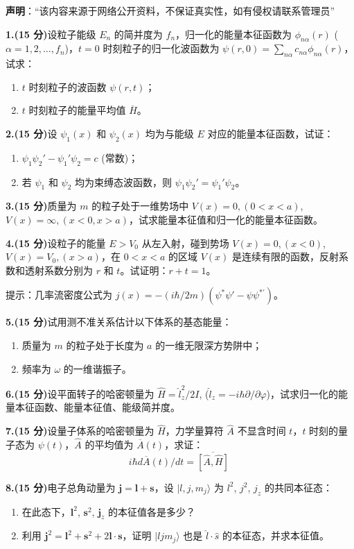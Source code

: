 
\textbf{声明}：“该内容来源于网络公开资料，不保证真实性，如有侵权请联系管理员”

\textbf{1.(15 分)}设粒子能级 $E_n$ 的简并度为 $f_n$，归一化的能量本征函数为 $\phi_{n\alpha}(r)$ ($\alpha = 1,2,\dots,f_n$)，$t = 0$ 时刻粒子的归一化波函数为 $\psi(r,0) = \sum_{n\alpha} c_{n\alpha} \phi_{n\alpha}(r)$，试求：

\begin{enumerate}
    \item $t$ 时刻粒子的波函数 $\psi(r,t)$；
    \item $t$ 时刻粒子的能量平均值 $ \overline{H} $。
\end{enumerate}

\textbf{2.(15 分)}设 $\psi_1(x)$ 和 $\psi_2(x)$ 均为与能级 $E$ 对应的能量本征函数，试证：
\begin{enumerate}
    \item $\psi_1 \psi_2' - \psi_1' \psi_2 = c$ (常数)；
    \item 若 $\psi_1$ 和 $\psi_2$ 均为束缚态波函数，则 $\psi_1 \psi_2' = \psi_1' \psi_2$。
\end{enumerate}

\textbf{3.(15 分)}质量为 $m$ 的粒子处于一维势场中 $V(x) = 0, (0 < x < a)$, $V(x) = \infty, (x < 0, x > a)$，试求能量本征值和归一化的能量本征函数。

\textbf{4.(15 分)}设粒子的能量 $E > V_0$ 从左入射，碰到势场 $V(x) = 0, (x < 0)$, $V(x) = V_0, (x > a)$，在 $0 < x < a$ 的区域 $V(x)$ 是连续有限的函数，反射系数和透射系数分别为 $r$ 和 $t$。试证明：$r + t = 1$。

提示：几率流密度公式为 $j(x) = -(i\hbar/2m)(\psi^*\psi'  - \psi\psi^{*'})$。

\textbf{5.(15 分)}试用测不准关系估计以下体系的基态能量：
\begin{enumerate}
    \item 质量为 $m$ 的粒子处于长度为 $a$ 的一维无限深方势阱中；
    \item 频率为 $\omega$ 的一维谐振子。
\end{enumerate}

\textbf{6.(15 分)}设平面转子的哈密顿量为 $\hat{H} = \hat{l}_z^2/2I$, ($\hat{l}_z = -i\hbar \partial/ \partial \varphi$)，试求归一化的能量本征函数、能量本征值、能级简并度。

\textbf{7.(15 分)}设量子体系的哈密顿量为 $\hat{H}$，力学量算符 $\hat{A}$ 不显含时间 $t$，$t$ 时刻的量子态为 $\psi(t)$，$\hat{A}$ 的平均值为 $\overline{A}(t)$，求证：
\[
i\hbar d\overline{A}(t)/dt = \overline{[\hat{A}, \hat{H}]}~
\]

\textbf{8.(15 分)}电子总角动量为 $\mathbf{j} = \mathbf{l} + \mathbf{s}$，设 $|l, j, m_j \rangle$ 为 $l^2$, $j^2$, $j_z$ 的共同本征态：

\begin{enumerate}
    \item 在此态下，$\mathbf{l}^2$, $\mathbf{s}^2$, $\mathbf{j}_z$ 的本征值各是多少？
    \item 利用 $\mathbf{j}^2 = \mathbf{l}^2 + \mathbf{s}^2 + 2\mathbf{l} \cdot \mathbf{s}$，证明 $|l j m_j\rangle$ 也是 $\hat{l} \cdot \hat{s}$ 的本征态，并求本征值。
\end{enumerate}